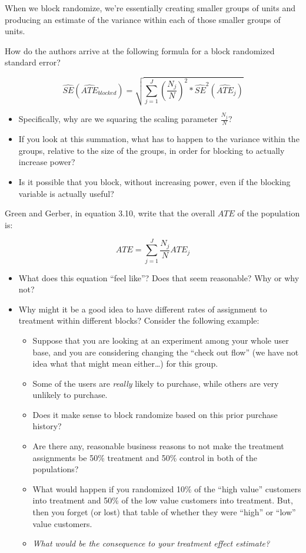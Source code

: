 \documentclass[
]{book}
\providecommand{\tightlist}{%
  \setlength{\itemsep}{0pt}\setlength{\parskip}{0pt}}
\begin{document}
When we block randomize, we're essentially creating smaller groups of
units and producing an estimate of the variance within each of those
smaller groups of units.

How do the authors arrive at the following formula for a block
randomized standard error?

\[ 
  \widehat{SE}(\widehat{ATE}_{blocked}) = \sqrt{\sum_{j=1}^{J}\left(\frac{N_{j}}{N}\right)^2 * \widehat{SE}^2(\widehat{ATE}_{j})}
\]

\begin{itemize}
\tightlist
\item
  Specifically, why are we squaring the scaling parameter
  \(\frac{N_{j}}{N}\)?
\item
  If you look at this summation, what has to happen to the variance
  within the groups, relative to the size of the groups, in order for
  blocking to actually increase power?
\item
  Is it possible that you block, without increasing power, even if the
  blocking variable is actually useful?
\end{itemize}

Green and Gerber, in equation 3.10, write that the overall \(ATE\) of
the population is:

\[ 
  ATE = \sum_{j=1}^{J} \frac{N_{j}}{N} ATE_{j}
\]

\begin{itemize}
\item
  What does this equation ``feel like''? Does that seem reasonable? Why
  or why not?
\item
  Why might it be a good idea to have different rates of assignment to
  treatment within different blocks? Consider the following example:

  \begin{itemize}
  \tightlist
  \item
    Suppose that you are looking at an experiment among your whole user
    base, and you are considering changing the ``check out flow'' (we
    have not idea what that might mean either\ldots) for this group.
  \item
    Some of the users are \emph{really} likely to purchase, while others
    are very unlikely to purchase.
  \item
    Does it make sense to block randomize based on this prior purchase
    history?
  \item
    Are there any, reasonable business reasons to not make the treatment
    assignments be 50\% treatment and 50\% control in both of the
    populations?
  \item
    What would happen if you randomized 10\% of the ``high value''
    customers into treatment and 50\% of the low value customers into
    treatment. But, then you forget (or lost) that table of whether they
    were ``high'' or ``low'' value customers.
  \item
    \emph{What would be the consequence to your treatment effect
    estimate?}
  \end{itemize}
\end{itemize}
\end{document}
